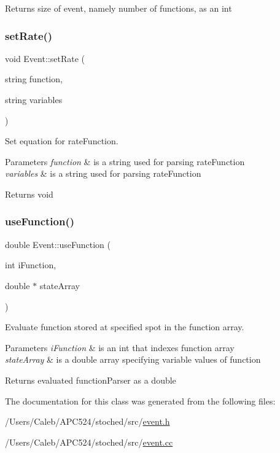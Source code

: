 \begin{DoxyReturn}{Returns}
size of event, namely number of functions, as an int 
\end{DoxyReturn}
\mbox{\label{class_event_a993a01984496bc158be92b67422f8655}} 
\subsubsection{\texorpdfstring{set\+Rate()}{setRate()}}
{\footnotesize\ttfamily void Event\+::set\+Rate (\begin{DoxyParamCaption}\item[{string}]{function,  }\item[{string}]{variables }\end{DoxyParamCaption})}



Set equation for rate\+Function. 


\begin{DoxyParams}{Parameters}
{\em function} & is a string used for parsing rate\+Function \\
\hline
{\em variables} & is a string used for parsing rate\+Function \\
\hline
\end{DoxyParams}
\begin{DoxyReturn}{Returns}
void 
\end{DoxyReturn}
\mbox{\label{class_event_a2637844b7f9583caf0f808c898dc2246}} 
\subsubsection{\texorpdfstring{use\+Function()}{useFunction()}}
{\footnotesize\ttfamily double Event\+::use\+Function (\begin{DoxyParamCaption}\item[{int}]{i\+Function,  }\item[{double $\ast$}]{state\+Array }\end{DoxyParamCaption})}



Evaluate function stored at specified spot in the function array. 


\begin{DoxyParams}{Parameters}
{\em i\+Function} & is an int that indexes function array \\
\hline
{\em state\+Array} & is a double array specifying variable values of function \\
\hline
\end{DoxyParams}
\begin{DoxyReturn}{Returns}
evaluated function\+Parser as a double 
\end{DoxyReturn}


The documentation for this class was generated from the following files\+:\begin{DoxyCompactItemize}
\item 
/\+Users/\+Caleb/\+A\+P\+C524/stoched/src/\hyperlink{event_8h}{event.\+h}\item 
/\+Users/\+Caleb/\+A\+P\+C524/stoched/src/\hyperlink{event_8cc}{event.\+cc}\end{DoxyCompactItemize}
